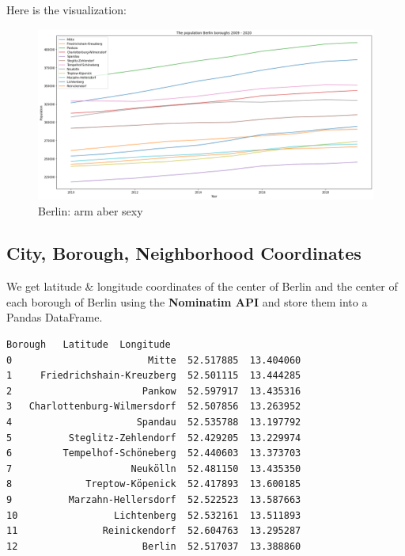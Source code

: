 \documentclass[11pt]{article}
\makeatletter
\newcommand{\boxspacing}{\kern\kvtcb@left@rule\kern\kvtcb@boxsep}
\newcommand{\prompt}[4]{
        {\ttfamily\llap{{\color{#2}[#3]:\hspace{3pt}#4}}\vspace{-\baselineskip}}
    }
\makeatother
\begin{document}
Here is the visualization:

  \begin{figure}
\centering
\includegraphics[width=16.5cm]{"output_19_0.png"}
\caption{Berlin: arm aber sexy}
\end{figure}


    
    \hypertarget{city-borough-neighborhood-coordinates}{%
\subsection{City, Borough, Neighborhood
Coordinates}\label{city-borough-neighborhood-coordinates}}

We get latitude \& longitude coordinates of the center of Berlin and
the center of each borough of Berlin using the \textbf{Nominatim API}
and store them into a Pandas DataFrame.

                \begin{tcolorbox}[breakable, size=fbox, boxrule=.5pt, pad at break*=1mm, opacityfill=0]
\begin{Verbatim}[commandchars=\\\{\}]
                       Borough   Latitude  Longitude
0                        Mitte  52.517885  13.404060
1     Friedrichshain-Kreuzberg  52.501115  13.444285
2                       Pankow  52.597917  13.435316
3   Charlottenburg-Wilmersdorf  52.507856  13.263952
4                      Spandau  52.535788  13.197792
5          Steglitz-Zehlendorf  52.429205  13.229974
6         Tempelhof-Schöneberg  52.440603  13.373703
7                     Neukölln  52.481150  13.435350
8             Treptow-Köpenick  52.417893  13.600185
9          Marzahn-Hellersdorf  52.522523  13.587663
10                 Lichtenberg  52.532161  13.511893
11               Reinickendorf  52.604763  13.295287
12                      Berlin  52.517037  13.388860
\end{Verbatim}
\end{tcolorbox}
        
\end{document}
